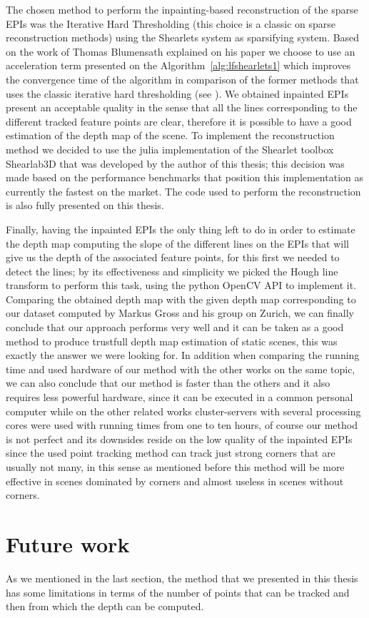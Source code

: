 \bigskip

The chosen method to perform the inpainting-based reconstruction of the sparse EPIs was the Iterative Hard Thresholding (this choice is a classic on sparse reconstruction methods) using the Shearlets system as sparsifying system. Based on the work of Thomas Blumensath explained on his paper \cite{hard-thresholding} we choose to use an acceleration term presented on the Algorithm~\ref{alg:lfshearlets1} which improves the convergence time of the algorithm in comparison of the former methods that uses the classic iterative hard thresholding (see \cite{clustered-inpainting}). We obtained inpainted EPIs present an acceptable quality in the sense that all the lines corresponding to the different tracked feature points are clear, therefore it is possible to have a good estimation of the depth map of the scene. To implement the reconstruction method we decided to use the julia implementation of the Shearlet toolbox Shearlab3D that was developed by the author of this thesis; this decision was made based on the performance benchmarks that position this implementation as currently the fastest on the market. The code used to perform the reconstruction is also fully presented on this thesis.

\bigskip

Finally, having the inpainted EPIs the only thing left to do in order to estimate the depth map computing the slope of the different lines on the EPIs that will give us the depth of the associated feature points, for this first we needed to detect the lines; by its effectiveness and simplicity we picked the Hough line transform to perform this task, using the python OpenCV API to implement it. Comparing the obtained depth map with the given depth map corresponding to our dataset computed by Markus Gross and his group on Zurich, we can finally conclude that our approach performs very well and it can be taken as a good method to produce trustfull depth map estimation of static scenes, this was exactly the answer we were looking for. In addition when comparing the running time and used hardware of our method with the other works on the same topic, we can also conclude that our method is faster than the others and it also requires less powerful hardware, since it can be executed in a common personal computer while on the other related works cluster-servers with several processing cores were used with running times from one to ten hours, of course our method is not perfect and its downsides reside on the low quality of the inpainted EPIs since the used point tracking method can track just strong corners that are usually not many, in this sense as mentioned before this method will be more effective in scenes dominated by corners and almost useless in scenes without corners.

\section{Future work}

As we mentioned in the last section, the method that we presented in this thesis has some limitations in terms of the number of points that can be tracked and then from which the depth can be computed. 

